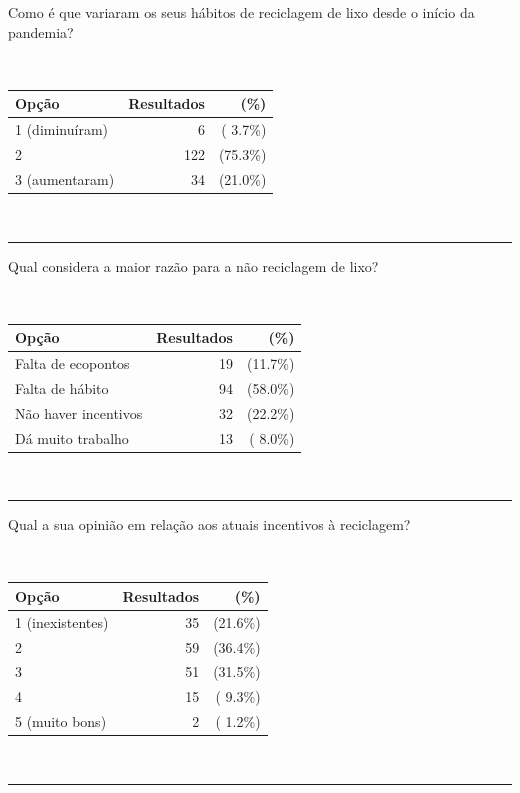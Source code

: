 \documentclass[11pt, a4paper, oneside]{book}
\begin{document}
\begin{appendices}
\begin{mdframed}[innerleftmargin=7.5mm, innerrightmargin=7.5mm, innertopmargin=7.5mm, innerbottommargin=7.5mm]
Como é que variaram os seus hábitos de reciclagem de lixo desde o início da pandemia?

~

\begin{tabular}{@{} l | r r @{} }
    \textbf{Opção} & \textbf{Resultados} & \textbf{(\%)} \\ \hline
    1 (diminuíram) &   6 & ( 3.7\%) \\
    2              & 122 & (75.3\%) \\
    3 (aumentaram) &  34 & (21.0\%)
\end{tabular}

~

\rule{\linewidth}{0.5pt}\vspace{0.5em}

Qual considera a maior razão para a não reciclagem de lixo?

~

\begin{tabular}{@{} l | r r @{} }
    \textbf{Opção} & \textbf{Resultados} & \textbf{(\%)} \\ \hline
    Falta de ecopontos   &  19 & (11.7\%) \\
    Falta de hábito      &  94 & (58.0\%) \\
    Não haver incentivos &  32 & (22.2\%)  \\
    Dá muito trabalho    &  13 & ( 8.0\%)
\end{tabular}

~

\rule{\linewidth}{0.5pt}\vspace{0.5em}

Qual a sua opinião em relação aos atuais incentivos à reciclagem?

~

\begin{tabular}{@{} l | r r @{} }
    \textbf{Opção} & \textbf{Resultados} & \textbf{(\%)} \\ \hline
    1 (inexistentes) &  35 & (21.6\%) \\
    2                &  59 & (36.4\%) \\
    3                &  51 & (31.5\%) \\
    4                &  15 & ( 9.3\%) \\
    5 (muito bons)   &   2 & ( 1.2\%)
\end{tabular}

~

\rule{\linewidth}{0.5pt}\vspace{0.5em}


\end{mdframed}
\end{appendices}
\end{document}
